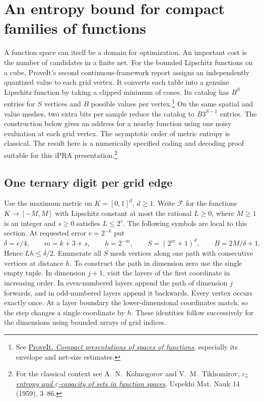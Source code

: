\section{An entropy bound for compact families of functions}\label{sec:entropy}

A function space can itself be a domain for optimization. An important cost is the number of candidates in a finite net. For the bounded Lipschitz functions on a cube, ProveIt's second continuous-framework report assigns an independently quantized value to each grid vertex. It converts each table into a genuine Lipschitz function by taking a clipped minimum of cones. Its catalog has $B^S$ entries for $S$ vertices and $B$ possible values per vertex.\footnote{See \href{https://github.com/VladimirReshetnikov/ProveIt/blob/b2341af5370cd8a43f72ebb2341c0d7d7395b634/Logic/PrimitiveRecursiveArithmetic/docs/proofs/foundations/ipra_continuous_framework_2026-11-20_2/paper/sections/03_function_spaces.tex}{ProveIt, \emph{Compact presentations of spaces of functions}}, especially its envelope and net-size estimates.}
On the same spatial and value meshes, two extra bits per sample reduce the catalog to $B3^{S-1}$ entries. The construction below gives an address for a nearby function using one noisy evaluation at each grid vertex. The asymptotic order of metric entropy is classical. The result here is a numerically specified coding and decoding proof suitable for this iPRA presentation.\footnote{For the classical context see A.~N.~Kolmogorov and V.~M.~Tikhomirov, \href{https://www.mathnet.ru/eng/rm7289}{\emph{\(\varepsilon\)-entropy and \(\varepsilon\)-capacity of sets in function spaces}}, Uspekhi Mat. Nauk 14 (1959), 3--86.}

\subsection{One ternary digit per grid edge}

Use the maximum metric on $K=[0,1]^d$, $d\ge1$. Write $\mathcal F$ for the functions $K\to[-M,M]$ with Lipschitz constant at most the rational $L\ge0$, where $M\ge1$ is an integer and $s\ge0$ satisfies $L\le2^s$. The following symbols are local to this section. At requested error $e=2^{-k}$ put
\[
 \delta=e/4,\qquad m=k+3+s,\qquad h=2^{-m},\qquad
 S=(2^m+1)^d,\qquad B=2M/\delta+1.
\]
Hence $Lh\le\delta/2$. Enumerate all $S$ mesh vertices along one path with consecutive vertices at distance $h$. To construct the path in dimension zero use the single empty tuple. In dimension $j+1$, visit the layers of the first coordinate in increasing order. In even-numbered layers append the path of dimension $j$ forwards, and in odd-numbered layers append it backwards. Every vertex occurs exactly once. At a layer boundary the lower-dimensional coordinates match, so the step changes a single coordinate by $h$. These identities follow successively for the dimensions using bounded arrays of grid indices.

